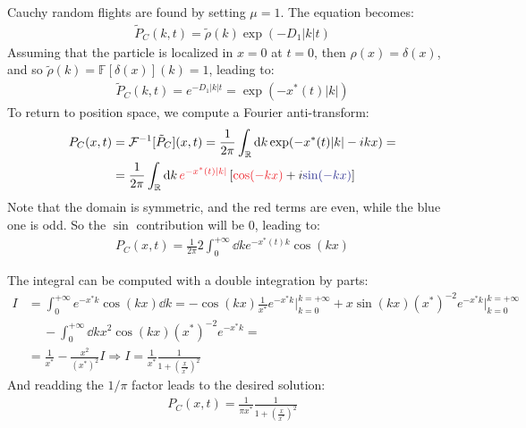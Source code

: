 \documentclass[../template.tex]{subfiles}
\begin{document}
\begin{exo}
Cauchy random flights are found by setting $\mu = 1$. The equation becomes:
\begin{align*}
    \tilde{P}_C(k,t) = \tilde{\rho}(k) \exp(-D_1 |k|t)
\end{align*}
Assuming that the particle is localized in $x=0$ at $t=0$, then $\rho(x) = \delta(x)$, and so $\tilde{\rho}(k) = \mathbb{F}[\delta(x)](k) = 1$, leading to:
\begin{align*}
    \tilde{P}_C(k,t) = e^{-D_1|k|t} = \exp(-x^*(t)|k|)
\end{align*}
To return to position space, we compute a Fourier anti-transform:
\begin{align*}
    P_C(x,t) &= \mathcal{F}^{-1} [\tilde{P}_C] (x,t) = \frac{1}{2\pi} \int_{\mathbb{R}} \dd{k} \exp(-x^*(t)|k| - ikx) = \\
    &=  \frac{1}{2\pi} \int_{\mathbb{R}} \dd{k} \textcolor{Red}{e^{-x^*(t)|k|}} \left[\textcolor{Red}{\cos(-kx)} + i \textcolor{Blue}{\sin(-kx)}\right] 
\end{align*}
Note that the domain is symmetric, and the red terms are even, while the blue one is odd. So the $\sin$ contribution will be $0$, leading to:
\begin{align*}
    P_C(x,t)= \frac{1}{2 \pi} 2 \int_0^{+\infty} \dd{k} e^{-x^*(t) k} \cos(kx) 
\end{align*}

The integral can be computed with a double integration by parts:
\begin{align*}
    I &= \int_0^{+\infty} e^{-x^* k} \cos(kx) \dd{k} = - \cos(kx) \frac{1}{x^*} e^{-x^*k} \Big|_{k=0}^{k=+\infty} + x \sin(kx) (x^*)^{-2} e^{-x^* k} \Big|_{k=0}^{k=+\infty}\\
    &\quad\> - \int_0^{+\infty}\dd{k} x^2 \cos(kx) (x^*)^{-2} e^{-x^* k} =\\
    &= \frac{1}{x^*} - \frac{x^2}{(x^*)^2}I \Rightarrow I = \frac{1}{x^*} \frac{1}{1+\left(\frac{x}{x^*} \right)^2}    
\end{align*}
And readding the $1/\pi$ factor leads to the desired solution:
\begin{align*}
    P_C(x,t) = \frac{1}{\pi x^*} \frac{1}{1+\left(\frac{x}{x^*} \right)^2}  
\end{align*}
\end{exo}
\end{document}
